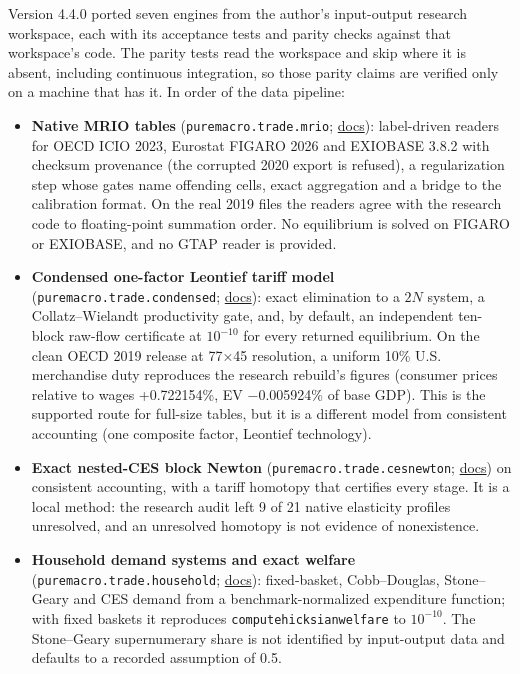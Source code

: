 \documentclass[11pt,letterpaper]{article}
\providecommand{\tightlist}{\setlength{\itemsep}{0pt}\setlength{\parskip}{0pt}}
\newcounter{none} %
\renewcommand{\_}{\pmunderscore\allowbreak}
\begin{document}
Version 4.4.0 ported seven engines from the author's input-output research workspace, each with its acceptance tests and parity checks against that workspace's code. The parity tests read the workspace and skip where it is absent, including continuous integration, so those parity claims are verified only on a machine that has it. In order of the data pipeline:

\begin{itemize}
\tightlist
\item
  \textbf{Native MRIO tables} (\texttt{puremacro.trade.mrio}; \href{https://github.com/jalonso1979/puremacro/blob/v4.6.0/docs/trade_mrio.md}{docs}): label-driven readers for OECD ICIO 2023, Eurostat FIGARO 2026 and EXIOBASE 3.8.2 with checksum provenance (the corrupted 2020 export is refused), a regularization step whose gates name offending cells, exact aggregation and a bridge to the calibration format. On the real 2019 files the readers agree with the research code to floating-point summation order. No equilibrium is solved on FIGARO or EXIOBASE, and no GTAP reader is provided.
\item
  \textbf{Condensed one-factor Leontief tariff model} (\texttt{puremacro.trade.condensed}; \href{https://github.com/jalonso1979/puremacro/blob/v4.6.0/docs/trade_condensed.md}{docs}): exact elimination to a \(2N\) system, a Collatz--Wielandt productivity gate, and, by default, an independent ten-block raw-flow certificate at \(10^{-10}\) for every returned equilibrium. On the clean OECD 2019 release at 77×45 resolution, a uniform 10\% U.S. merchandise duty reproduces the research rebuild's figures (consumer prices relative to wages +0.722154\%, EV −0.005924\% of base GDP). This is the supported route for full-size tables, but it is a different model from consistent accounting (one composite factor, Leontief technology).
\item
  \textbf{Exact nested-CES block Newton} (\texttt{puremacro.trade.ces\_newton}; \href{https://github.com/jalonso1979/puremacro/blob/v4.6.0/docs/trade_ces_newton.md}{docs}) on consistent accounting, with a tariff homotopy that certifies every stage. It is a local method: the research audit left 9 of 21 native elasticity profiles unresolved, and an unresolved homotopy is not evidence of nonexistence.
\item
  \textbf{Household demand systems and exact welfare} (\texttt{puremacro.trade.household}; \href{https://github.com/jalonso1979/puremacro/blob/v4.6.0/docs/trade_household.md}{docs}): fixed-basket, Cobb--Douglas, Stone--Geary and CES demand from a benchmark-normalized expenditure function; with fixed baskets it reproduces \texttt{compute\_hicksian\_welfare} to \(10^{-10}\). The Stone--Geary supernumerary share is not identified by input-output data and defaults to a recorded assumption of 0.5.

\end{itemize}
\end{document}
